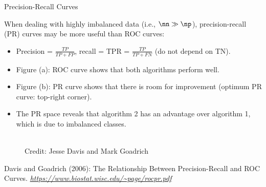 







\begin{vbframe}{Precision-Recall Curves}

\begin{footnotesize}
When dealing with highly imbalanced data (i.e., $\nn \gg \np$), precision-recall (PR) curves may be more useful than ROC curves:

\begin{itemize}
  \item Precision = $\frac{TP}{TP + FP}$, recall = TPR = $\frac{TP}{TP + FN}$ (do not depend on TN).
  \item Figure (a): ROC curve shows that both algorithms perform well.
  \item Figure (b): PR curve shows that there is room for improvement (optimum PR curve: top-right corner).
  \item The PR space reveals that algorithm 2 has an advantage over algorithm 1, which is due to imbalanced classes.
\end{itemize}
\end{footnotesize}
\begin{figure}
    \centering
    \tiny{\\ Credit: Jesse Davis and Mark Goadrich \\}
\end{figure}
{\tiny{Davis and Goadrich (2006): The Relationship Between Precision-Recall and ROC Curves. \emph{\url{https://www.biostat.wisc.edu/~page/rocpr.pdf}}}\par}


\end{vbframe}
